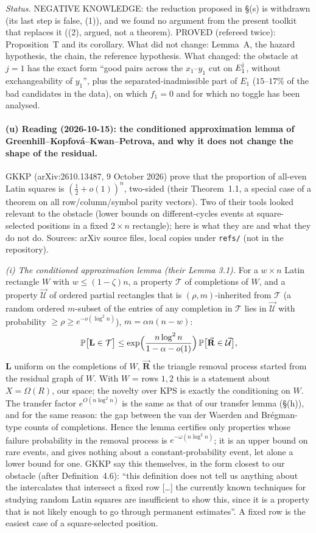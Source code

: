 \emph{Status.}  NEGATIVE KNOWLEDGE: the reduction proposed in \S(s)
is withdrawn (its last step is false, (1)), and we found no argument from
the present toolkit that replaces it ((2), argued, not a theorem).  PROVED
(refereed twice): Proposition~T and its corollary.  What did not
change: Lemma~A, the hazard hypothesis, the chain, the reference
hypothesis.  What changed: the obstacle at $j=1$ has the exact form
``good pairs across the $x_1$--$y_1$ cut on $E_1^{\rm j}$, without
exchangeability of $y_1$'', plus the separated-inadmissible part of
$E_1$ ($15$--$17\%$ of the bad candidates in the data), on which
$f_1=0$ and for which no toggle has been analysed.

\paragraph{(u) Reading (2026-10-15): the conditioned approximation lemma of
Greenhill--Kopfov\'a--Kwan--Petrova, and why it does not change the
shape of the residual.}  GKKP (arXiv:2610.13487, 9 October 2026) prove
that the proportion of all-even Latin squares is $(\frac12+o(1))^n$,
two-sided (their Theorem~1.1, a special case of a theorem on all
row/column/symbol parity vectors).  Two of their tools looked relevant
to the obstacle (lower bounds on different-cycles events at
square-selected positions in a fixed $2\times n$ rectangle); here is
what they are and what they do not do.  Sources: arXiv source files,
local copies under \texttt{refs/} (not in the repository).

\emph{(i) The conditioned approximation lemma (their Lemma 3.1).}  For a
$w\times n$ Latin rectangle $W$ with $w\le(1-\zeta)n$, a property
$\mathcal T$ of completions of $W$, and a property $\vec{\mathcal U}$
of ordered partial rectangles that is $(\rho,m)$-inherited from
$\mathcal T$ (a random ordered $m$-subset of the entries of any
completion in $\mathcal T$ lies in $\vec{\mathcal U}$ with probability
$\ge\rho\ge e^{-o(\log^2n)}$), $m=\alpha n(n-w)$:
\[
\Pr\bigl[\mathbf L\in\mathcal T\bigr]\le
\exp\Bigl(\frac{n\log^2n}{1-\alpha-o(1)}\Bigr)\,
\Pr\bigl[\vec{\mathbf R}\in\vec{\mathcal U}\bigr],
\]
$\mathbf L$ uniform on the completions of $W$, $\vec{\mathbf R}$ the
triangle removal process started from the residual graph of $W$.
With $W$ = rows $1,2$ this is a statement about $X=\Omega(R)$, our
space; the novelty over KPS is exactly the conditioning on $W$.  The
transfer factor $e^{O(n\log^2n)}$ is the same as that of our transfer
lemma (\S(h)), and for the same reason: the gap between the van der
Waerden and Br\'egman-type counts of completions.  Hence the lemma
certifies only properties whose failure probability in the removal
process is $e^{-\omega(n\log^2n)}$; it is an upper bound on rare
events, and gives nothing about a constant-probability event, let alone
a lower bound for one.  GKKP say this themselves, in the form closest
to our obstacle (after Definition~4.6): ``this definition does not
tell us anything about the intercalates that intersect a fixed row
[\dots] the currently known techniques for studying random Latin
squares are insufficient to show this, since it is a property that is
not likely enough to go through permanent estimates''.  A fixed row is
the easiest case of a square-selected position.

